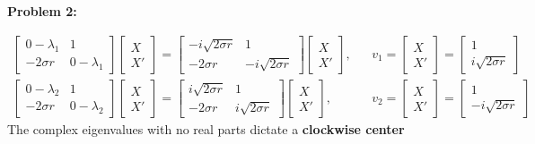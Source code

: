 \documentclass[11pt]{article}
\newenvironment{problem}[1]{\textbf{Problem #1: }}{\newpage}
\begin{document}
\begin{problem}{2}
\begin{enumerate}[label = (\alph*)]
			\begin{align*}
			\begin{bmatrix}
			0-\lambda_1 & 1 \\ -2\sigma r & 0-\lambda_1 
			\end{bmatrix}\begin{bmatrix}
			X \\ X'
			\end{bmatrix} = 
			\begin{bmatrix}
			-i\sqrt{2\sigma r} & 1 \\ -2\sigma r & -i\sqrt{2\sigma r}
			\end{bmatrix}\begin{bmatrix}
			X \\ X'
			\end{bmatrix}, && v_1 = \begin{bmatrix}
			X \\ X'
			\end{bmatrix} = \begin{bmatrix}
			1 \\ i\sqrt{2\sigma r}
			\end{bmatrix}
			\\
			\begin{bmatrix}
			0-\lambda_2 & 1 \\ -2\sigma r & 0-\lambda_2
			\end{bmatrix}\begin{bmatrix}
			X \\ X'
			\end{bmatrix} = 
			\begin{bmatrix}
			i\sqrt{2\sigma r} & 1 \\ -2\sigma r & i\sqrt{2\sigma r}
			\end{bmatrix}\begin{bmatrix}
			X \\ X'
			\end{bmatrix}, && v_2 = \begin{bmatrix}
			X \\ X'
			\end{bmatrix} = \begin{bmatrix}
			1 \\ -i\sqrt{2\sigma r}
			\end{bmatrix}
			\end{align*}
			The complex eigenvalues with no real parts dictate a \textbf{clockwise center}
		\end{enumerate}
	\end{problem}
\end{document}
